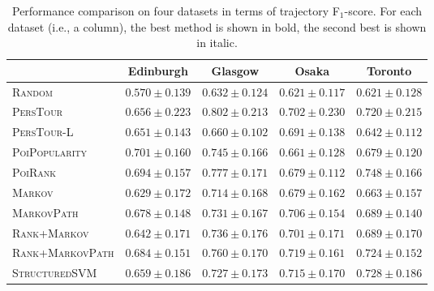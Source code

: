 \begin{table*}
\centering
\begin{tabular}{l|cccc} \hline
 & Edinburgh & Glasgow & Osaka & Toronto \\ \hline
\textsc{Random} & $0.570\pm0.139$ & $0.632\pm0.124$ & $0.621\pm0.117$ & $0.621\pm0.128$ \\
\textsc{PersTour}\cite{ijcai15} & $0.656\pm0.223$ & $\mathbf{0.802\pm0.213}$ & $0.702\pm0.230$ & $0.720\pm0.215$ \\
\textsc{PersTour-L} & $0.651\pm0.143$ & $0.660\pm0.102$ & $0.691\pm0.138$ & $0.642\pm0.112$ \\
\textsc{PoiPopularity} & $\mathbf{0.701\pm0.160}$ & $0.745\pm0.166$ & $0.661\pm0.128$ & $0.679\pm0.120$ \\
\textsc{PoiRank} & $\mathit{0.694\pm0.157}$ & $\mathit{0.777\pm0.171}$ & $0.679\pm0.112$ & $\mathbf{0.748\pm0.166}$ \\
\textsc{Markov} & $0.629\pm0.172$ & $0.714\pm0.168$ & $0.679\pm0.162$ & $0.663\pm0.157$ \\
\textsc{MarkovPath} & $0.678\pm0.148$ & $0.731\pm0.167$ & $0.706\pm0.154$ & $0.689\pm0.140$ \\
\textsc{Rank+Markov} & $0.642\pm0.171$ & $0.736\pm0.176$ & $0.701\pm0.171$ & $0.689\pm0.170$ \\
\textsc{Rank+MarkovPath} & $0.684\pm0.151$ & $0.760\pm0.170$ & $\mathbf{0.719\pm0.161}$ & $0.724\pm0.152$ \\
\textsc{StructuredSVM} & $0.659\pm0.186$ & $0.727\pm0.173$ & $\mathit{0.715\pm0.170}$ & $\mathit{0.728\pm0.186}$ \\
\hline
\end{tabular}
\caption{Performance comparison on four datasets in terms of trajectory F$_1$-score. 
         For each dataset (i.e., a column), the best method is shown in bold, the second best is shown in italic.}
\label{table:f1}
\end{table*}


